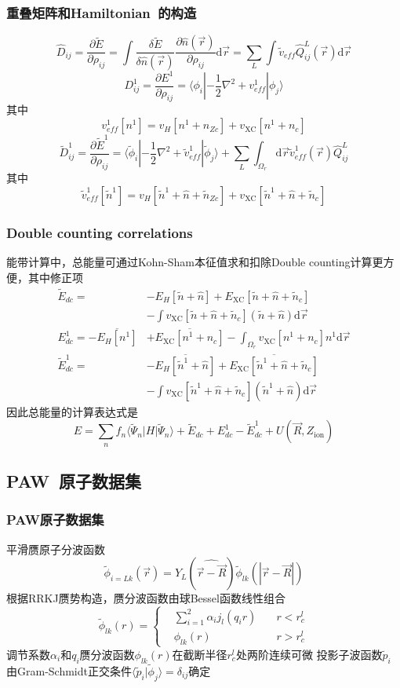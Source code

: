 \documentclass[cjk,slidestop,compress,mathserif,blue]{beamer}
\begin{document}
\frame
{
	\frametitle{重叠矩阵和\textrm{Hamiltonian~}的构造}
	$$\hat D_{ij}=\dfrac{\partial\tilde E}{\partial\rho_{ij}}=\int\dfrac{\delta\tilde E}{\delta\hat n(\vec  r)}\dfrac{\partial\hat n(\vec r)}{\partial\rho_{ij}}\mathrm{d}\vec r=\sum_{L}\int\tilde v_{e\!f\!f}\hat Q_{ij}^L(\vec r)\mathrm{d}\vec r$$
	$$D_{ij}^1=\dfrac{\partial E^1}{\partial\rho_{ij}}=\langle\phi_i|-\dfrac12\nabla^2+v_{e\!f\!f}^1|\phi_j\rangle$$
	其中$$v_{e\!f\!f}^1[n^1]=v_H[n^1+n_{Zc}]+v_{\mathrm{XC}}[n^1+n_c]$$
	$$\tilde D_{ij}^1=\dfrac{\partial\tilde E^1}{\partial\rho_{ij}}=\langle\tilde\phi_i|-\dfrac12\nabla^2+\tilde v_{e\!f\!f}^1|\tilde\phi_j\rangle+\sum_L\int_{\Omega_r}\mathrm{d}\vec r\tilde v_{e\!f\!f}^1(\vec r)\hat Q_{ij}^L$$
	其中$$\tilde v_{e\!f\!f}^1[\tilde n^1]=v_H[\tilde n^1+\hat n+\tilde n_{Zc}]+v_{\mathrm{XC}}[\tilde n^1+\hat n+\tilde n_c]$$
}

\frame
{
	\frametitle{\textrm{Double counting correlations}}
	能带计算中，总能量可通过\textrm{Kohn-Sham}本征值求和扣除\textrm{Double counting}计算更方便，其中修正项
	\begin{displaymath}
		\begin{aligned}
			\tilde E_{dc}=&-E_H[\tilde n+\hat n]+E_{\mathrm{XC}}[\tilde n+\hat n+\tilde n_c]\\
			&-\int v_{\mathrm{XC}}[\tilde n+\hat n+\tilde n_c](\tilde n+\hat n)\mathrm{d}\vec r\\
			E_{dc}^1=-\overline{E_H[n^1]}&+\overline{E_{\mathrm{XC}}[n^1+n_c]}-\int_{\Omega_r}v_{\mathrm{XC}}[n^1+n_c]n^1\mathrm{d}\vec r\\
			\tilde E_{dc}^1=&-\overline{E_H[\tilde n^1+\hat n]}+\overline{E_{\mathrm{XC}}[\tilde n^1+\hat n+\tilde n_c]}\\
			&-\int v_{\mathrm{XC}}[\tilde n^1+\hat n+\tilde n_c](\tilde n^1+\hat n)\mathrm{d}\vec r
		\end{aligned}
	\end{displaymath}
	因此总能量的计算表达式是
	$$E=\sum_nf_n\langle\tilde\Psi_n|H|\tilde\Psi_n\rangle+\tilde E_{dc}+E_{dc}^1-\tilde E_{dc}^1+U(\vec R,Z_{\mathrm{ion}})$$
}

\subsection{\rm{PAW~}原子数据集}
\frame
{
	\frametitle{\textrm{PAW}原子数据集}
	平滑赝原子分波函数
	\begin{displaymath}
		\tilde\phi_{i=Lk}(\vec r)=Y_L(\widehat{\vec r-\vec R})\tilde\phi_{lk}(|\vec r-\vec R|)
	\end{displaymath}
	根据\textrm{RRKJ}赝势构造，赝分波函数由球\textrm{Bessel}函数线性组合
	\begin{displaymath}
		\tilde\phi_{lk}(r)=\left\{
		\begin{aligned}
			&\sum_{i=1}^2\alpha_ij_l(q_ir)\quad &r<r_c^l\\
			&\phi_{lk}(r)\quad&r>r_c^l
		\end{aligned}
		\right.
	\end{displaymath}
	调节系数$\alpha_i$和$q_i$赝分波函数$\phi_{lk}(r)$在截断半径$r_c^l$处两阶连续可微
	投影子波函数$\tilde p_i$由\textrm{Gram-Schmidt}正交条件$\langle\tilde p_i|\tilde\phi_j\rangle=\delta_{ij}$确定
}
\end{document}
